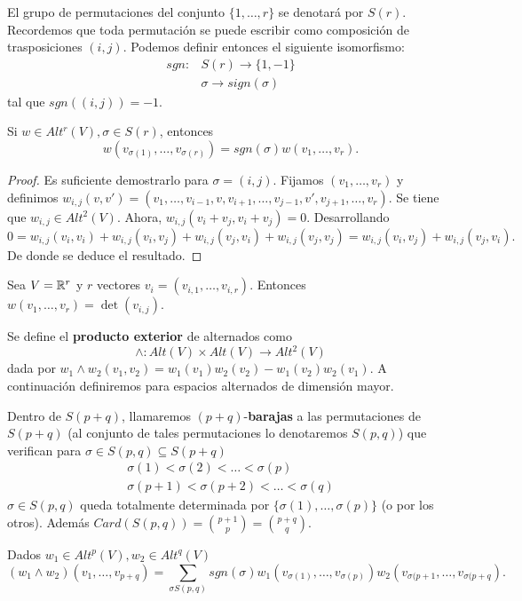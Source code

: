 \documentclass[cursovd_portada.tex]{subfiles}
\begin{document}
El grupo de permutaciones del conjunto $\{1,\dots, r\}$ se denotará por $S(r)$. Recordemos que toda permutación se puede escribir como composición de trasposiciones $(i,j)$. Podemos definir entonces el siguiente isomorfismo:
\begin{align*}
sgn: & S(r)\to \{1,-1\}\\
& \sigma\to sign(\sigma)
\end{align*}
tal que $sgn((i,j))=-1$. 
\begin{lemma}
Si $w\in Alt^r(V), \sigma\in S(r)$, entonces
$$w(v_{\sigma(1)},\dots, v_{\sigma(r)})=sgn(\sigma)w(v_1,\dots, v_r).$$
\end{lemma}
\begin{proof}
Es suficiente demostrarlo para $\sigma=(i,j)$. Fijamos $(v_1,\dots, v_r)$ y definimos $w_{i,j}(v,v')=(v_1,\dots,v_{i-1},v,v_{i+1},\dots, v_{j-1},v',v_{j+1},\dots, v_r)$. Se tiene que $w_{i,j}\in Alt^2(V)$. Ahora, $w_{i,j}(v_i+v_j,v_i+v_j)=0$. Desarrollando
$$
0=w_{i,j}(v_i,v_i)+w_{i,j}(v_i,v_j)+w_{i,j}(v_j,v_i)+w_{i,j}(v_j,v_j)=w_{i,j}(v_i,v_j)+w_{i,j}(v_j,v_i).$$
De donde se deduce el resultado.
\end{proof}
\begin{ej}
Sea $V=\mathbb{R}^r$ y $r$ vectores $v_i=(v_{i,1},\dots, v_{i,r})$. Entonces $w(v_1,\dots, v_r)=\det(v_{i,j})$. 
\end{ej}

\begin{defi}\label{ext}
Se define el \textbf{producto exterior} de alternados como 
$$\land:Alt(V)\times Alt(V)\to Alt^2(V)$$
dada por $w_1\land w_2(v_1,v_2)=w_1(v_1)w_2(v_2)-w_1(v_2)w_2(v_1)$. A continuación definiremos para espacios alternados de dimensión mayor.
\end{defi}
\begin{defi}
Dentro de $S(p+q)$, llamaremos $(p+q)$-\textbf{barajas} a las permutaciones de $S(p+q)$ (al conjunto de tales permutaciones lo denotaremos $S(p,q)$) que verifican para $\sigma\in S(p,q)\subseteq S(p+q)$
\begin{align*}
\sigma(1)<\sigma(2)<\dots<\sigma(p)\\
\sigma(p+1)<\sigma(p+2)<\dots<\sigma(q)
\end{align*}
$\sigma\in S(p,q)$ queda totalmente determinada por $\{\sigma(1),\dots, \sigma(p)\}$ (o por los otros). Además $Card(S(p,q))=\binom{p+1}{p}=\binom{p+q}{q}$.
\end{defi}
Dados $w_1\in Alt^p(V),w_2\in Alt^q(V)$
$$
(w_1\land w_2)(v_1,\dots, v_{p+q})=\sum_{\sigma S(p,q)} sgn(\sigma)w_1(v_{\sigma(1)},\dots, v_{\sigma(p)})w_2(v_{\sigma(p+1},\dots, v_{\sigma(p+q}).$$
\end{document}

